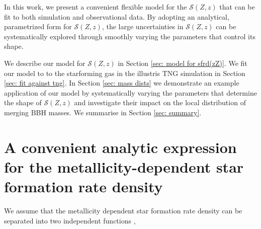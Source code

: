 \documentclass[twocolumn]{aastex631}
\newcommand{\SFRDzZ}{\ensuremath{\mathcal{S}(Z,z)}\xspace}
\newcommand{\SFRDz}{\ensuremath{\mathrm{SFRD}(z)}\xspace}
\newcommand{\dpdZ}{\ensuremath{\mathrm{dP/dZ}(Z,z)}\xspace}
\begin{document}




In this work, we present a convenient flexible model for the \SFRDzZ that can be fit to both simulation and observational data. By adopting an analytical, parametrized form for \SFRDzZ, the large uncertainties in \SFRDzZ can be systematically explored through smoothly varying the parameters that control its shape. 

We describe our model for \SFRDzZ in Section \ref{sec: model for sfrd(zZ)}.
We fit our model to to the starforming gas in the illustris TNG simulation in Section \ref{sec: fit against tng}. In Section \ref{sec: mass dists} we demonstrate an example application of our model by systematically varying the parameters that determine the shape of \SFRDzZ and investigate their impact on the local distribution of merging BBH masses.
We summarise in Section \ref{sec: summary}.

\section{A convenient analytic expression for the metallicity-dependent star formation rate density \label{sec: model for sfrd(zZ)} }
We assume that the metallicity dependent star formation rate density can be separated into two independent functions \citep[e.g.\ ][]{Langer2006},
\end{document}
